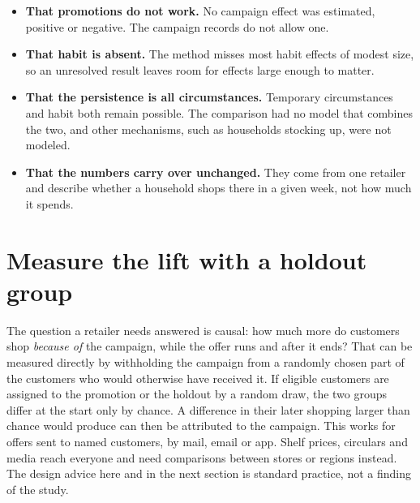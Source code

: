 \documentclass[11pt]{article}
\begin{document}
\begin{itemize}[itemsep=4pt]
\item \textbf{That promotions do not work.} No campaign effect was estimated, positive or
negative. The campaign records do not allow one.
\item \textbf{That habit is absent.} The method misses most habit effects of modest size, so an
unresolved result leaves room for effects large enough to matter.
\item \textbf{That the persistence is all circumstances.} Temporary circumstances and habit both
remain possible. The comparison had no model that combines the two, and other mechanisms, such
as households stocking up, were not modeled.
\item \textbf{That the numbers carry over unchanged.} They come from one retailer and describe
whether a household shops there in a given week, not how much it spends.
\end{itemize}

\section{Measure the lift with a holdout group}

The question a retailer needs answered is causal: how much more do customers shop
\emph{because of} the campaign, while the offer runs and after it ends? That can be measured
directly by withholding the campaign from a randomly chosen part of the customers who would
otherwise have received it. If eligible customers are assigned to the promotion or the holdout
by a random draw, the two groups differ at the start only by chance. A difference in their
later shopping larger than chance would produce can then be attributed to the campaign. This
works for offers sent to named customers, by mail, email or app. Shelf prices, circulars and
media reach everyone and need comparisons between stores or regions instead. The design advice
here and in the next section is standard practice, not a finding of the study.
\end{document}
